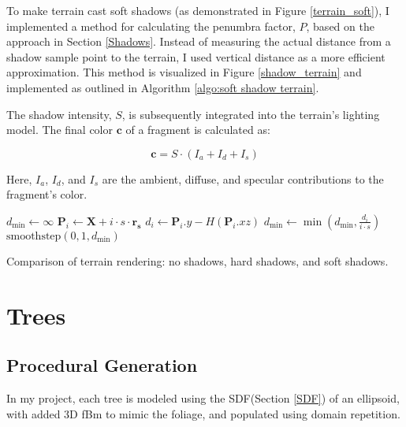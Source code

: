 To make terrain cast soft shadows (as demonstrated in Figure \ref{terrain_soft}), I implemented a method for calculating the penumbra factor, $P$, based on the approach in Section \ref{Shadows}. Instead of measuring the actual distance from a shadow sample point to the terrain, I used vertical distance as a more efficient approximation. This method is visualized in Figure \ref{shadow_terrain} and implemented as outlined in Algorithm \ref{algo:soft shadow terrain}.

The shadow intensity, $S$, is subsequently integrated into the terrain's lighting model. The final color $\mathbf{c}$ of a fragment is calculated as:

\begin{equation}
    \mathbf{c} = S \cdot (I_{a} + I_{d} + I_{s})
\end{equation}

Here, $I_{a}$, $I_{d}$, and $I_{s}$ are the ambient, diffuse, and specular contributions to the fragment's color.



\begin{algorithm}
\caption{Terrain Shadow Calculation}
\label{algo:soft shadow terrain}
\begin{algorithmic}
    \State $d_{\text{min}} \gets \infty$
        \State $\mathbf{P}_i \gets \mathbf{X} + i \cdot s \cdot \mathbf{r_s}$
        \State $d_i \gets \mathbf{P}_i.y - H(\mathbf{P}_i.xz)$
        \State $d_{\text{min}} \gets \min(d_{\text{min}}, \frac{d_i}{i \cdot s})$
    \EndFor
    \State \Return $\text{smoothstep}(0, 1, d_{\text{min}})$
\EndFunction
\end{algorithmic}
\end{algorithm}

{Comparison of terrain rendering: no shadows, hard shadows, and soft shadows.}

\section{Trees}

\subsection{Procedural Generation}
\label{Tree Procedural Generation}

In my project, each tree is modeled using the SDF(Section \ref{SDF}) of an ellipsoid, with added 3D fBm to mimic the foliage, and populated using domain repetition. 

